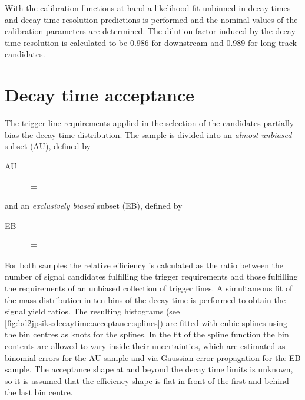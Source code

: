 With the calibration functions at hand a likelihood fit unbinned in decay
times and decay time resolution predictions is performed and the nominal
values of the calibration parameters are determined. The dilution factor
induced by the decay time resolution is calculated to be \num{0.986} for
downstream and \num{0.989} for long track candidates.

\section{Decay time acceptance}
\label{sec:bd2jpsiks:decaytime:acceptance}

The trigger line requirements applied in the selection of the \BdToJPsiKS
candidates partially bias the decay time distribution. The sample is divided
into an \emph{almost unbiased} subset (AU), defined by
\begin{description}
  \item[AU] $\equiv$ 
\end{description}
and an \emph{exclusively biased} subset (EB), defined by
\begin{description}
  \item[EB] $\equiv$ 
\end{description}

For both samples the relative efficiency is calculated as the ratio between
the number of signal candidates fulfilling the trigger requirements and those
fulfilling the requirements of an unbiased collection of trigger lines. A
simultaneous fit of the mass distribution in ten bins of the decay time is
performed to obtain the signal yield ratios. The resulting histograms (see
\cref{fig:bd2jpsiks:decaytime:acceptance:splines}) are fitted with cubic
splines using the bin centres as knots for the splines. In the fit of the
spline function the bin contents are allowed to vary inside their
uncertainties, which are estimated as binomial errors for the AU sample and
via Gaussian error propagation for the EB sample. The acceptance shape at and
beyond the decay time limits is unknown, so it is assumed that the efficiency
shape is flat in front of the first and behind the last bin centre.

